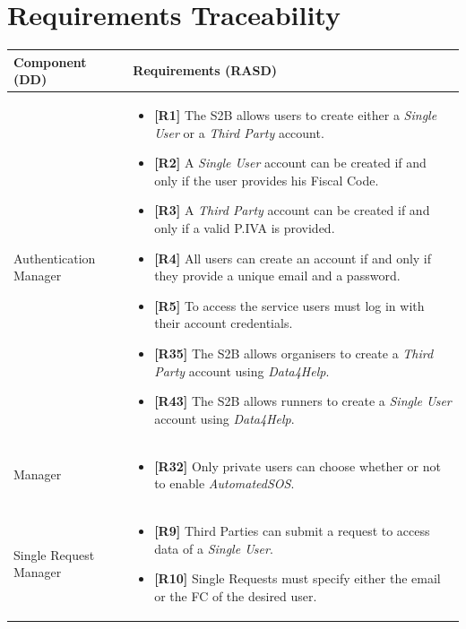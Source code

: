 \documentclass[titlepage]{article}
\begin{document}
	
	\section{Requirements Traceability}
	
	\begin{longtable}{| p{5 cm} | p{8 cm} |} \hline
		Component (DD) & Requirements (RASD)  \\ \hline
		\newline Authentication Manager & 
		\begin{itemize}
			\item {\bf [R1]} The S2B allows users to create either a {\it Single User} or a {\it Third Party} account. 
			\item {\bf [R2]} A {\it Single User} account can be created if and only if the user provides his Fiscal Code. 
			\item {\bf [R3]} A {\it Third Party} account can be created if and only if a valid P.IVA is provided. 
			\item {\bf [R4]} All users can create an account if and only if they provide a unique email and a password. 
			\item {\bf [R5]} To access the service users must log in with their account credentials.
			\item {\bf [R35]} The S2B allows organisers to create a {\it Third Party} account using {\it Data4Help}.
			\item {\bf [R43]} The S2B allows runners to create a {\it Single User} account using {\it Data4Help}.
		\end{itemize}	\\ \hline
		\newline {\it Single User} Manager & 
		\begin{itemize}
			\item {\bf [R32]} Only private users can choose whether or not to enable {\it AutomatedSOS}. 
		\end{itemize}		
		\\	 \hline	
		\newline Single Request Manager & 
		\begin{itemize}
			\item {\bf [R9]} Third Parties can submit a request to access data of a {\it Single User}. 
			\item {\bf [R10]} Single Requests must specify either the email or the FC of the desired user.

\end{itemize}
\end{longtable}
\end{document}
